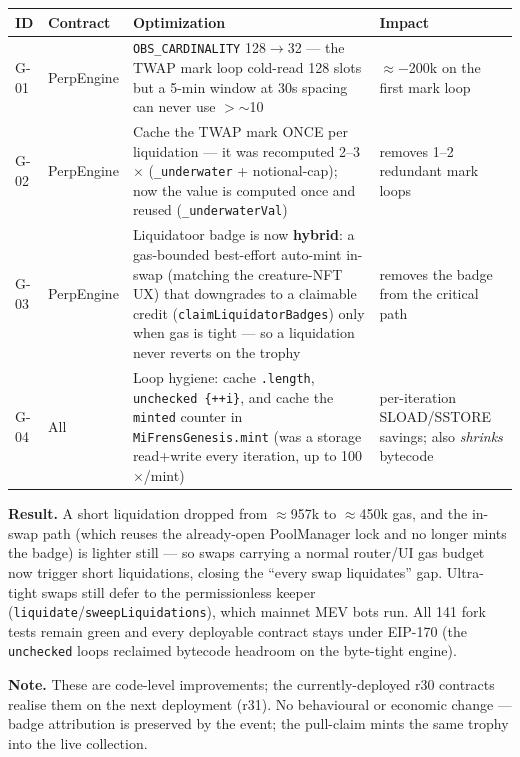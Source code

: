 \documentclass[11pt]{article}
\begin{document}
\begin{center}\small
\begin{longtable}{llp{}l}
\toprule
\textbf{ID} & \textbf{Contract} & \textbf{Optimization} & \textbf{Impact}\\
\midrule
\endhead
G-01 & PerpEngine & \texttt{OBS\_CARDINALITY} 128$\rightarrow$32 — the TWAP mark
  loop cold-read 128 slots but a 5-min window at 30s spacing can never use $>$$\sim$10 & $\approx$$-$200k on the first mark loop\\
G-02 & PerpEngine & Cache the TWAP mark ONCE per liquidation — it was recomputed
  2--3$\times$ (\texttt{\_underwater} + notional-cap); now the value is computed once
  and reused (\texttt{\_underwaterVal}) & removes 1--2 redundant mark loops\\
G-03 & PerpEngine & Liquidatoor badge is now \textbf{hybrid}: a gas-bounded
  best-effort auto-mint in-swap (matching the creature-NFT UX) that downgrades to a
  claimable credit (\texttt{claimLiquidatorBadges}) only when gas is tight — so a
  liquidation never reverts on the trophy & removes the badge from the critical path\\
G-04 & All & Loop hygiene: cache \texttt{.length}, \texttt{unchecked \{++i\}},
  and cache the \texttt{minted} counter in \texttt{MiFrensGenesis.mint} (was a
  storage read+write every iteration, up to 100$\times$/mint) & per-iteration SLOAD/SSTORE
  savings; also \emph{shrinks} bytecode\\
\bottomrule
\end{longtable}
\end{center}

\noindent\textbf{Result.} A short liquidation dropped from $\approx$957k to
$\approx$450k gas, and the in-swap path (which reuses the already-open PoolManager
lock and no longer mints the badge) is lighter still — so swaps carrying a normal
router/UI gas budget now trigger short liquidations, closing the ``every swap
liquidates'' gap. Ultra-tight swaps still defer to the permissionless keeper
(\texttt{liquidate}/\texttt{sweepLiquidations}), which mainnet MEV bots run. All 141
fork tests remain green and every deployable contract stays under EIP-170 (the
\texttt{unchecked} loops reclaimed bytecode headroom on the byte-tight engine).

\noindent\textbf{Note.} These are code-level improvements; the currently-deployed r30
contracts realise them on the next deployment (r31). No behavioural or economic
change — badge attribution is preserved by the event; the pull-claim mints the same
trophy into the live collection.
\end{document}
